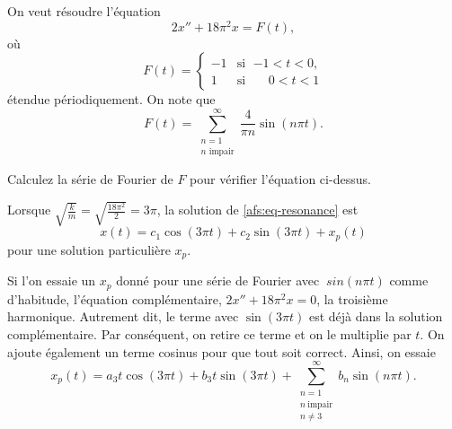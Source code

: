 \begin{example}
On veut résoudre l'équation
\begin{equation} \label{afs:eq-resonance}
2 x'' + 18 \pi^2 x = F(t) ,
\end{equation}
où
\begin{equation*}
F(t) =
\begin{cases}
-1 & \text{si } \; {-1} < t < 0 , \\
1 & \text{si } \; \phantom{-}0 < t < 1
\end{cases}
\end{equation*}
étendue périodiquement. On note que
\begin{equation*}
F(t) =
\sum_{\substack{n=1 \\ n \text{ impair}}}^\infty
\frac{4}{\pi n}
\sin (n \pi t) . 
\end{equation*}

\begin{exercise}
Calculez la série de Fourier de $F$ pour vérifier l'équation ci-dessus.
\end{exercise}

Lorsque $\sqrt{\frac{k}{m}} = \sqrt{\frac{18\pi^2}{2}} = 3\pi$,
la solution de \eqref{afs:eq-resonance} est
\begin{equation*}
x(t) = c_1 \cos  (3\pi t) + c_2 \sin (3\pi t) + x_p (t)
\end{equation*}
pour une solution particulière $x_p$.

Si l'on essaie un $ x_p $ donné pour une série de Fourier avec $ \ sin (n \pi t) $ comme d'habitude,
l'équation complémentaire, $2x'' + 18 \pi ^2x = 0$,  la troisième harmonique.  %
Autrement dit, le terme avec $\sin(3 \pi t)$ est déjà dans la solution complémentaire.
Par conséquent, on retire ce terme et on le multiplie par $t$. On ajoute également un terme cosinus pour que tout soit correct.
Ainsi, on essaie
\begin{equation*}
x_p(t) =
a_3
t \cos (3 \pi t )
+
b_3
t \sin (3 \pi t)
+
\sum_{\substack{n=1 \\ n~\text{impair} \\ n \not= 3}}^\infty
b_n
\sin (n \pi t) . 
\end{equation*}


\end{example}

